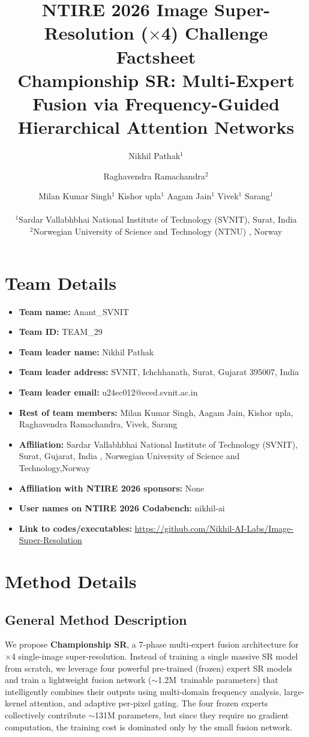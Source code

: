 \documentclass[10pt,twocolumn,letterpaper]{article}
\title{NTIRE 2026 Image Super-Resolution ($\times$4) Challenge Factsheet\\
Championship SR: Multi-Expert Fusion via Frequency-Guided\\Hierarchical Attention Networks}
\author{Nikhil Pathak$^{1}$\\
\and
Raghavendra Ramachandra$^{2}$\\
\and
Milan Kumar Singh$^{1}$ \quad Kishor upla$^{1}$ \quad Aagam Jain$^{1}$ \quad Vivek$^{1}$ \quad Sarang$^{1}$\\
\\
$^{1}$Sardar Vallabhbhai National Institute of Technology (SVNIT), Surat, India
\\
$^{2}$Norwegian University of Science and Technology (NTNU) , Norway
}
\begin{document}
\maketitle

\section{Team Details}

\begin{itemize}[nosep,leftmargin=*]
\item \textbf{Team name:} Anant\_SVNIT
\item \textbf{Team ID:} TEAM\_29
\item \textbf{Team leader name:} Nikhil Pathak
\item \textbf{Team leader address:} SVNIT, Ichchhanath, Surat, Gujarat 395007, India
\item \textbf{Team leader email:} u24ec012@eced.svnit.ac.in
\item \textbf{Rest of team members:} Milan Kumar Singh, Aagam Jain, Kishor upla, Raghavendra Ramachandra, Vivek, Sarang
\item \textbf{Affiliation:} Sardar Vallabhbhai National Institute of Technology (SVNIT), Surat, Gujarat, India ,
Norwegian University of Science and Technology,Norway 
\item \textbf{Affiliation with NTIRE 2026 sponsors:} None
\item \textbf{User names on NTIRE 2026 Codabench:} nikhil-ai
\item \textbf{Link to codes/executables:} \url{https://github.com/Nikhil-AI-Labs/Image-Super-Resolution}
\end{itemize}

\section{Method Details}

\subsection{General Method Description}

We propose \textbf{Championship SR}, a 7-phase multi-expert fusion architecture for $\times$4 single-image super-resolution. Instead of training a single massive SR model from scratch, we leverage four powerful pre-trained (frozen) expert SR models and train a lightweight fusion network ($\sim$1.2M~trainable parameters) that intelligently combines their outputs using multi-domain frequency analysis, large-kernel attention, and adaptive per-pixel gating. The four frozen experts collectively contribute $\sim$131M parameters, but since they require no gradient computation, the training cost is dominated only by the small fusion network.
\end{document}
